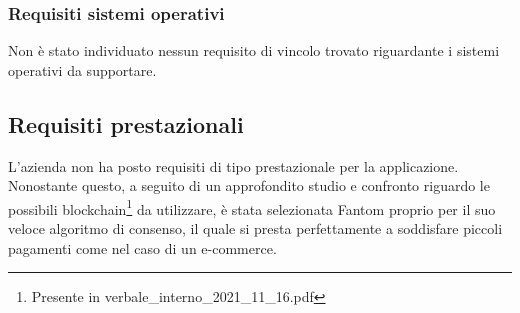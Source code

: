 \subsubsection{Requisiti sistemi operativi}

Non è stato individuato nessun requisito di vincolo trovato riguardante i sistemi operativi da supportare.

\subsection{Requisiti prestazionali} \label{subsection:requisiti_prestazionali}

L'azienda non ha posto requisiti di tipo prestazionale per la applicazione.
Nonostante questo, a seguito di un approfondito studio e confronto riguardo le possibili blockchain\footnote{Presente in verbale\_interno\_2021\_11\_16.pdf} da utilizzare, è stata selezionata Fantom\glo{} proprio per il suo veloce algoritmo di consenso, il quale si presta perfettamente a soddisfare piccoli pagamenti
come nel caso di un e-commerce\glo{}.
